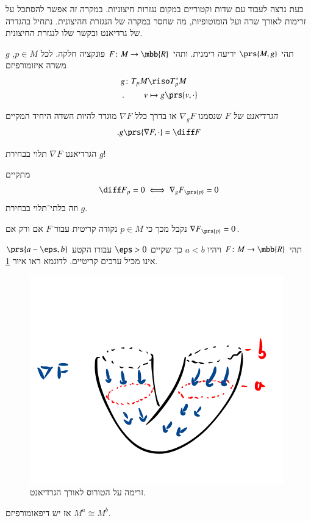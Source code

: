 \documentclass[a4paper,10pt,twoside,openany]{book}
\begin{document}
כעת נרצה לעבוד עם שדות וקטוריים במקום נגזרות חיצוניות. במקרה זה אפשר להסתכל על זרימות לאורך שדה ועל הומוטופיות, מה שחסר במקרה של הנגזרת חהיצונית. נתחיל בהגדרה של גרדיאנט ובקשר שלו לנגזרת החיצונית.

\begin{definition}[גרדיאנט]
תהי
$\prs{M,g}$
יריעה רימנית.
ותהי
$F \colon M \to \mbb{R}$
פונקציה חלקה.
לכל
$p \in M$,
$g$
משרה איזומורפיזם
\begin{align*}
g \colon T_p M &\riso T_p^* M \\
\text{.} \hphantom{lalala} v &\mapsto g\prs{v, \cdot}
\end{align*}

\emph{הגרדיאנט של
$F$}
שנסמנו
$\nabla_g F$
או בדרך כלל
$\nabla F$
מוגדר להיות השדה היחיד המקיים
\begin{align*}
\text{.} g\prs{\nabla F, \cdot} = \diff F
\end{align*}
\end{definition}

\begin{remark}
הגרדיאנט
$\nabla F$
תלוי בבחירת
$g$!
\end{remark}

\begin{remark}
מתקיים
\[\diff F_p = 0 \iff \nabla_g F_{\prs{p}} = 0\]
וזה בלתי־תלוי בבחירת
$g$.

נקבל מכך כי
$p \in M$
נקודה קריטית עבור
$F$
אם ורק אם
$\nabla F_{\prs{p}} = 0$.
\end{remark}

\begin{proposition}
תהי
$F \colon M \to \mbb{R}$
ויהיו
$a < b$
כך שקיים
$\eps > 0$
עבורו הקטע
$\prs{a-\eps, b}$
אינו מכיל ערכים קריטיים.
לדוגמא ראו איור
\ref{1.8}.

\begin{figure}
\centering
\includegraphics[scale=0.5]{sources/1.8}
\caption{זרימה על הטורוס לאורך הגרדיאנט.}
\label{1.8}
\end{figure}

אז יש דיפאומורפיזם
$M^a \cong M^b$.
\end{proposition}
\end{document}
